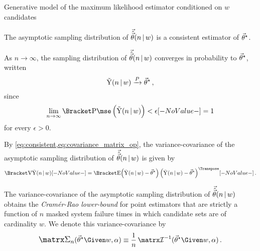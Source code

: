 \documentclass[ ../main.tex]{subfiles}
\begin{document}
\fussy
\begin{algorithm}[H]
\DontPrintSemicolon
{}
\BlankLine
{}
\caption{Generative model of the maximum likelihood estimator conditioned on $w$ candidates}
\label{alg:samp_d_gen_model}
\end{algorithm}

The asymptotic sampling distribution of $\vec{\hat{\vec{\theta}}}(n {\,|\,} w)$ is a consistent estimator of ${\vec{\theta}}^{\star}$.
\begin{postulate}
\label{def:consistent}
    As $n \to \infty$, the sampling distribution of $\vec{\hat{\vec{\theta}}}(n {\,|\,} w)$ converges in probability to ${\vec{\theta}}^{\star}$, written
    \begin{equation}
    \label{eq:consistent}
        \mathrm{\vec{Y}}(n {\,|\,} w) \xrightarrow{P} {\vec{\theta}}^{\star}\,,
    \end{equation}
    since
    \begin{equation}
    \lim_{n \to \infty} \Prob{\mse\left(\sampd\right) < \epsilon} = 1
    \end{equation}
    for every $\epsilon > 0$.
\end{postulate}

By \cref{eq:consistent,eq:covariance_matrix_op}, the variance-covariance of the asymptotic sampling distribution of $\vec{\hat{\vec{\theta}}}(n {\,|\,} w)$ is given by
\begin{equation}
\label{def:asym_covariance_matrix}
    \Var{\sampd} = \Expect{
        \left(\sampd - \tparam\sysparamvec \right)
        \left(\sampd - \tparam\sysparamvec \right)^{\Transpose}}\,.
\end{equation}

\begin{postulate}
The variance-covariance of the asymptotic sampling distribution of $\vec{\hat{\vec{\theta}}}(n {\,|\,} w)$ obtains the \emph{Cram\'{e}r-Rao lower-bound} for point estimators that are strictly a function of $n$ masked system failure times in which candidate sets are of cardinality $w$. We denote this variance-covariance by
\begin{equation}
    \cov(\tparam\sysparamvec \Given w, \alpha) \equiv \frac{1}{n} \infomatrx^{-1}(\tparam\sysparamvec\Given w, \alpha)\,.
\end{equation}
\end{postulate}
\end{document}
